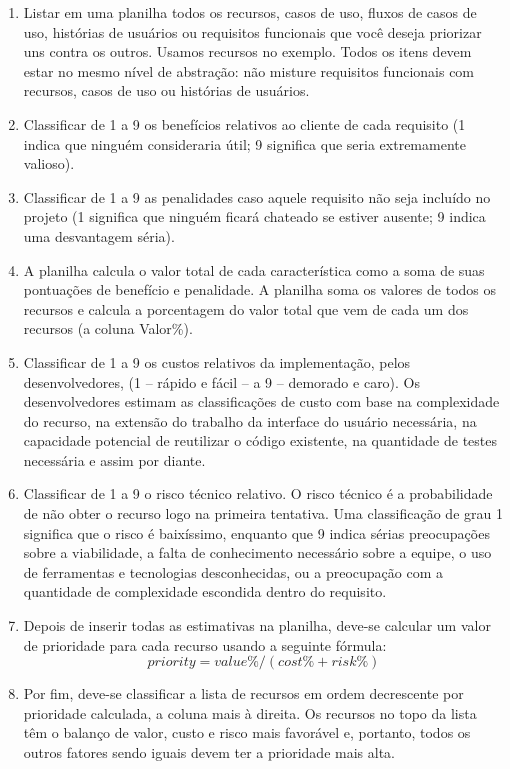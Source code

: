 \documentclass[runningheads]{llncs}
\begin{document}
\begin{enumerate}
    \item Listar em uma planilha todos os recursos, casos de uso, fluxos de casos de uso, histórias de usuários ou requisitos funcionais que você deseja priorizar uns contra os outros. Usamos recursos no exemplo. Todos os itens devem estar no mesmo nível de abstração: não misture requisitos funcionais com recursos, casos de uso ou histórias de usuários.
    \item Classificar de 1 a 9 os benefícios relativos ao cliente de cada requisito (1 indica que ninguém consideraria útil; 9 significa que seria extremamente valioso).
    \item Classificar de 1 a 9 as penalidades caso aquele requisito não seja incluído no projeto (1 significa que ninguém ficará chateado se estiver ausente; 9 indica uma desvantagem séria).
    \item A planilha calcula o valor total de cada característica como a soma de suas pontuações de benefício e penalidade. A planilha soma os valores de todos os recursos e calcula a porcentagem do valor total que vem de cada um dos recursos (a coluna Valor\%).
    \item Classificar de 1 a 9 os custos relativos da implementação, pelos desenvolvedores, (1 -- rápido e fácil -- a 9 -- demorado e caro). Os desenvolvedores estimam as classificações de custo com base na complexidade do recurso, na extensão do trabalho da interface do usuário necessária, na capacidade potencial de reutilizar o código existente, na quantidade de testes necessária e assim por diante.
    \item Classificar de 1 a 9 o risco técnico relativo. O risco técnico é a probabilidade de não obter o recurso logo na primeira tentativa. Uma classificação de grau 1 significa que o risco é baixíssimo, enquanto que 9 indica sérias preocupações sobre a viabilidade, a falta de conhecimento necessário sobre a equipe, o uso de ferramentas e tecnologias desconhecidas, ou a preocupação com a quantidade de complexidade escondida dentro do requisito.
    \item Depois de inserir todas as estimativas na planilha, deve-se calcular um valor de prioridade para cada recurso usando a seguinte fórmula: 
        \begin{equation}
            priority = value\% / (cost\% + risk\%)
        \end{equation}
    \item Por fim, deve-se classificar a lista de recursos em ordem decrescente por prioridade calculada, a coluna mais à direita. Os recursos no topo da lista têm o balanço de valor, custo e risco mais favorável e, portanto, todos os outros fatores sendo iguais devem ter a prioridade mais alta. 
\end{enumerate}
\end{document}
